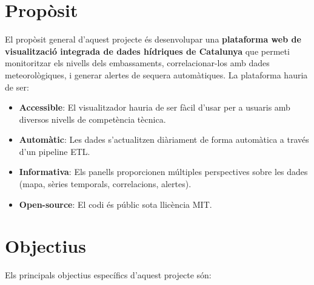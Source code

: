 
\section{Propòsit}

El propòsit general d'aquest projecte és desenvolupar una \textbf{plataforma web de visualització integrada de dades hídriques de Catalunya} que permeti monitoritzar els nivells dels embassaments, correlacionar-los amb dades meteorològiques, i generar alertes de sequera automàtiques. La plataforma hauria de ser:

\begin{itemize}
    \item \textbf{Accessible}: El visualitzador hauria de ser fàcil d'usar per a usuaris amb diversos nivells de competència tècnica.
    \item \textbf{Automàtic}: Les dades s'actualitzen diàriament de forma automàtica a través d'un pipeline ETL.
    \item \textbf{Informativa}: Els panells proporcionen múltiples perspectives sobre les dades (mapa, sèries temporals, correlacions, alertes).
    \item \textbf{Open-source}: El codi és públic sota llicència MIT.
\end{itemize}


\section{Objectius}

Els principals objectius específics d'aquest projecte són:

